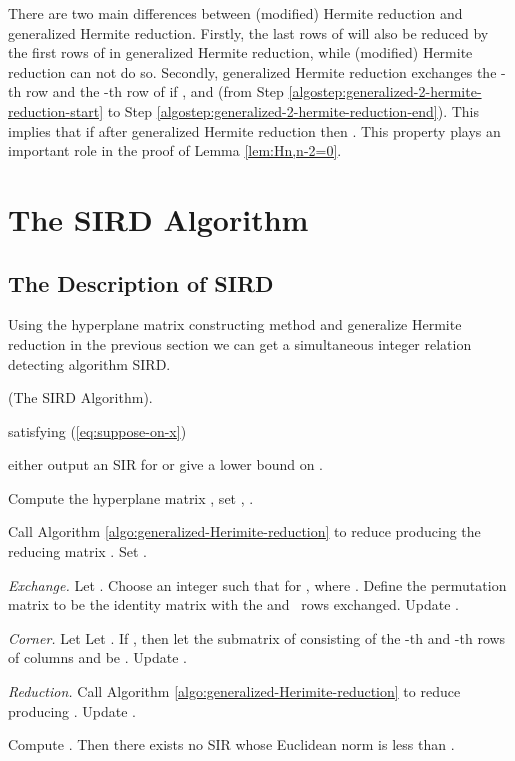 \documentclass{sig-alternate}
\numberwithin{theorem}{section} \numberwithin{equation}{section}
\begin{document}
\begin{rem}\label{rem:generalized-Hermite-reduction}
 There are two main differences between
(modified) Hermite reduction and  generalized Hermite reduction.
Firstly, the last  rows of  will also be reduced by the
first  rows of  in generalized Hermite reduction, while
(modified) Hermite reduction can not do so. Secondly, generalized
Hermite reduction exchanges the -th row and the -th row of
 if ,  and 
(from Step \ref{algostep:generalized-2-hermite-reduction-start} to
Step \ref{algostep:generalized-2-hermite-reduction-end}). This
implies that if  after  generalized Hermite
reduction then . This
property plays an important role in the proof of Lemma
\ref{lem:Hn,n-2=0}.
\end{rem}

\section{The SIRD Algorithm}\label{sec:The SIRD algorithm}
\subsection{The Description of SIRD}
\label{subsec:The algorithm description} Using the hyperplane matrix
constructing method and generalize Hermite reduction in the previous
section we can get a simultaneous integer relation detecting
algorithm SIRD.

\begin{algorithm}[t!]
\caption{(The SIRD Algorithm).}
\begin{algorithmic}[1]
\REQUIRE  satisfying (\ref{eq:suppose-on-x})


\ENSURE either output an SIR for  or give a lower bound on
.

 Compute the hyperplane matrix , set
, .

 Call Algorithm
\ref{algo:generalized-Herimite-reduction} to reduce 
producing the reducing matrix . Set .

\LOOP

\STATE\label{algostep:exchange} {\em Exchange.} Let .
Choose an integer  such that  for , where . Define the permutation matrix  to be the identity
matrix with the  and ~rows exchanged. Update .


\STATE\label{algostep:corner} {\em Corner.} Let
 Let . If
,
 then let the submatrix of  consisting of the -th and
-th rows of columns  and  be
.
Update .


\STATE\label{algostep:reduction} {\em Reduction.} Call Algorithm
\ref{algo:generalized-Herimite-reduction} to reduce 
producing . Update .

\STATE Compute .
Then there  exists no SIR whose Euclidean norm is less than .
\label{algostep:bound-of-possible-relations}





\ENDLOOP
\end{algorithmic}\label{algo:Simultaneous-relation}
\end{algorithm}
\end{document}
